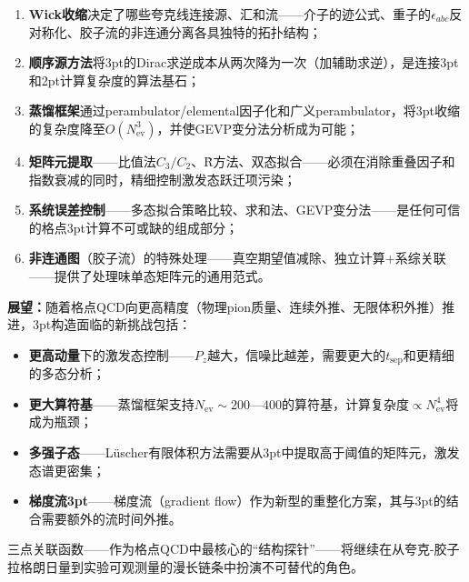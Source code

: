 \documentclass[12pt,a4paper]{ctexart}
\theoremstyle{definition}
\begin{document}
\begin{enumerate}[leftmargin=*]
    \item \textbf{Wick收缩}决定了哪些夸克线连接源、汇和流——介子的迹公式、重子的$\epsilon_{abc}$反对称化、胶子流的非连通分离各具独特的拓扑结构；
    \item \textbf{顺序源方法}将3pt的Dirac求逆成本从两次降为一次（加辅助求逆），是连接3pt和2pt计算复杂度的算法基石；
    \item \textbf{蒸馏框架}通过perambulator/elemental因子化和广义perambulator，将3pt收缩的复杂度降至$O(N_{\text{ev}}^3)$，并使GEVP变分法分析成为可能；
    \item \textbf{矩阵元提取}——比值法$C_3/C_2$、R̃方法、双态拟合——必须在消除重叠因子和指数衰减的同时，精细控制激发态跃迁项污染；
    \item \textbf{系统误差控制}——多态拟合策略比较、求和法、GEVP变分法——是任何可信的格点3pt计算不可或缺的组成部分；
    \item \textbf{非连通图}（胶子流）的特殊处理——真空期望值减除、独立计算+系综关联——提供了处理味单态矩阵元的通用范式。
\end{enumerate}

\textbf{展望：}随着格点QCD向更高精度（物理pion质量、连续外推、无限体积外推）推进，3pt构造面临的新挑战包括：

\begin{itemize}[leftmargin=*]
    \item \textbf{更高动量}下的激发态控制——$P_z$越大，信噪比越差，需要更大的$t_{\text{sep}}$和更精细的多态分析；
    \item \textbf{更大算符基}——蒸馏框架支持$N_{\text{ev}} \sim 200$—$400$的算符基，计算复杂度$\propto N_{\text{ev}}^4$将成为瓶颈；
    \item \textbf{多强子态}——L\"uscher有限体积方法需要从3pt中提取高于阈值的矩阵元，激发态谱更密集；
    \item \textbf{梯度流3pt}——梯度流（gradient flow）作为新型的重整化方案，其与3pt的结合需要额外的流时间外推。
\end{itemize}

三点关联函数——作为格点QCD中最核心的``结构探针''——将继续在从夸克-胶子拉格朗日量到实验可观测量的漫长链条中扮演不可替代的角色。

\end{document}
